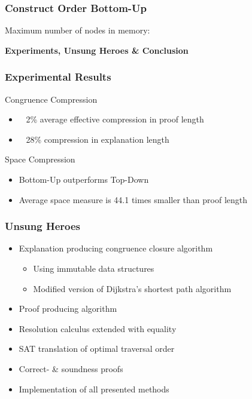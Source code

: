 \documentclass{beamer}
\begin{document}
\begin{frame}
	\frametitle{Construct Order Bottom-Up}
	\centering
	Maximum number of nodes in memory:
		 \\[1cm]
	
\end{frame}

\begin{frame}

\centering \textbf{\huge{Experiments, Unsung Heroes \& Conclusion}}

\end{frame}

\begin{frame}

\frametitle{Experimental Results}

\begin{block}{Congruence Compression}
	\begin{itemize}
		\item ~ 2\% average effective compression in proof length
		\item ~ 28\% compression in explanation length
	\end{itemize}
\end{block}

\begin{block}{Space Compression}
	\begin{itemize}
		\item Bottom-Up outperforms Top-Down
		\item Average space measure is 44.1 times smaller than proof length
	\end{itemize}
\end{block}

\end{frame}

\begin{frame}

\frametitle{Unsung Heroes}

\begin{itemize}
	\item Explanation producing congruence closure algorithm
	\begin{itemize}
		\item Using immutable data structures
		\item Modified version of Dijkstra's shortest path algorithm
	\end{itemize}
	\item Proof producing algorithm
	\item Resolution calculus extended with equality
	\item SAT translation of optimal traversal order
	\item Correct- \&  soundness proofs
	\item Implementation of all presented methods
\end{itemize}

\end{frame}
\end{document}
